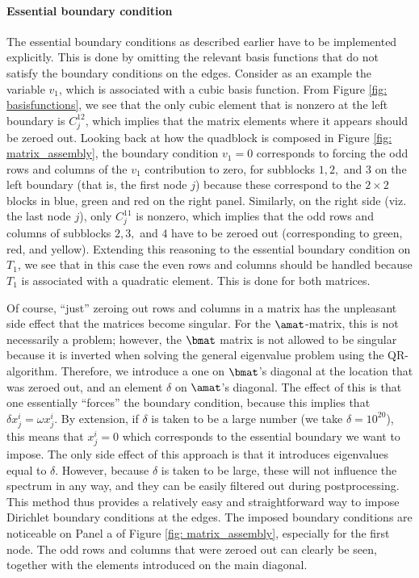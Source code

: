 \paragraph{Essential boundary condition}
The essential boundary conditions as described earlier have to be implemented explicitly. This is done by omitting the relevant basis functions that do not satisfy the boundary conditions on the edges. Consider as an example the variable $v_1$, which is associated with a cubic basis function. From Figure \ref{fig: basisfunctions}, we see that the only cubic element that is nonzero at the left boundary is $C_j^{12}$, which implies that the matrix elements where it appears should be zeroed out. Looking back at how the quadblock is composed in Figure \ref{fig: matrix_assembly}, the boundary condition $v_1 = 0$ corresponds to forcing the odd rows and columns of the $v_1$ contribution to zero, for subblocks $1, 2,$ and $3$ on the left boundary (that is, the first node $j$) because these correspond to the $2 \times 2$ blocks in blue, green and red on the right panel. Similarly, on the right side (viz. the last node $j$), only $C_j^{11}$ is nonzero, which implies that the odd rows and columns of subblocks $2, 3,$ and $4$ have to be zeroed out (corresponding to green, red, and yellow). Extending this reasoning to the essential boundary condition on $T_1$, we see that in this case the even rows and columns should be handled because $T_1$ is associated with a quadratic element. This is done for both matrices.

Of course, ``just'' zeroing out rows and columns in a matrix has the unpleasant side effect that the matrices become singular. For the $\amat$-matrix, this is not necessarily a problem; however, the $\bmat$ matrix is not allowed to be singular because it is inverted when solving the general eigenvalue problem using the QR-algorithm. Therefore, we introduce a one on $\bmat$'s diagonal at the location that was zeroed out, and an element $\delta$ on $\amat$'s diagonal. The effect of this is that one essentially ``forces'' the boundary condition, because this implies that $\delta x_j^i = \omega x_j^i$. By extension, if $\delta$ is taken to be a large number (we take $\delta = 10^{20}$), this means that $x_j^i = 0$ which corresponds to the essential boundary we want to impose. The only side effect of this approach is that it introduces eigenvalues equal to $\delta$. However, because $\delta$ is taken to be large, these will not influence the spectrum in any way, and they can be easily filtered out during postprocessing. This method thus provides a relatively easy and straightforward way to impose Dirichlet boundary conditions at the edges. The imposed boundary conditions are noticeable on Panel a of Figure \ref{fig: matrix_assembly}, especially for the first node. The odd rows and columns that were zeroed out can clearly be seen, together with the elements introduced on the main diagonal.





\cleardoublepage

